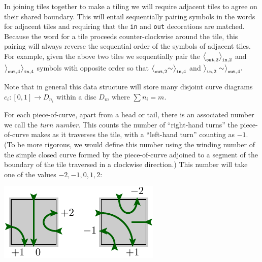 In joining tiles together to make a tiling we will
require adjacent tiles to agree on their shared boundary.
This will entail sequentially pairing symbols in the
words for adjacent tiles
and requiring that 
the {\tt in} and {\tt out} decorations are matched.
Because the word for a tile proceeds counter-clockwise
around the tile, this pairing will always reverse the
sequential order of the symbols of adjacent tiles.
For example, given the above two tiles we sequentially pair the 
$\bigl<_{\mathrm{\tt out},2}\bigr>_{\mathrm{\tt in},2}$ 
and $\bigr>_{\mathrm{\tt out},4}\bigr>_{\mathrm{\tt in},4}$
symbols with opposite order so that
$\bigl<_{\mathrm{\tt out},2}\sim\bigr>_{\mathrm{\tt in},4}$
and $\bigr>_{\mathrm{\tt in},2} \sim \bigr>_{\mathrm{\tt out},4}.$ 

\vskip 5pt


Note that in general this data structure will store many disjoint curve diagrams
$c_i:[0,1]\to D_{n_i}$ within a disc $D_m$ where $\sum n_i = m.$


For each piece-of-curve, apart from a head or tail, there is an associated 
number we call the \emph{turn number}. This counts the number
of ``right-hand turns'' the piece-of-curve makes as it
traverses the tile, with a ``left-hand turn'' counting as $-1.$
(To be more rigorous, we would define this number using the
winding number of the simple closed curve formed by the
piece-of-curve adjoined to a segment of the boundary of the tile 
traversed in a clockwise direction.)
This number will take one of the values $-2, -1, 0, 1, 2:$
\begin{center}
\includegraphics[]{pic-cells-3.pdf}
\end{center}


